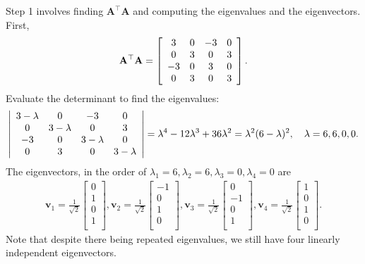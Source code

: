 Step 1 involves finding $\mathbf{A}^\top \mathbf{A}$ and computing the eigenvalues and the eigenvectors. First,
\begin{align}
  \mathbf{A}^\top \mathbf{A} = \left[ \begin{array}{c c c c}
   3 &  0 & -3 &  0 \\
   0 &  3 &  0 &  3 \\
  -3 &  0 &  3 &  0 \\
   0 &  3 &  0 &  3 \\ \end{array}  \right] .
\end{align}
Evaluate the determinant to find the eigenvalues:
\begin{align}
  \left| \begin{array}{c c c c}
   3 - \lambda &  0 & -3 &  0 \\
   0 &  3 - \lambda &  0 &  3 \\
  -3 &  0 &  3 - \lambda &  0 \\
   0 &  3 &  0 &  3 - \lambda \\ \end{array} \right| = \lambda^4 - 12 \lambda^3 + 36 \lambda^2 = \lambda^2 ( 6 - \lambda )^2 , \quad \lambda = 6, 6, 0, 0.
\end{align}
The eigenvectors, in the order of $\lambda_1 = 6, \lambda_2 = 6, \lambda_3 = 0, \lambda_4 = 0$ are
\begin{align}
  \mathbf{v}_1 = \frac{1}{\sqrt{2}} \left[ \begin{array}{c}  0 \\  1 \\  0 \\  1 \\ \end{array} \right] , 
  \mathbf{v}_2 = \frac{1}{\sqrt{2}} \left[ \begin{array}{c} -1 \\  0 \\  1 \\  0 \\ \end{array} \right] , 
  \mathbf{v}_3 = \frac{1}{\sqrt{2}} \left[ \begin{array}{c}  0 \\ -1 \\  0 \\  1 \\ \end{array} \right] , 
  \mathbf{v}_4 = \frac{1}{\sqrt{2}} \left[ \begin{array}{c}  1 \\  0 \\  1 \\  0 \\ \end{array} \right] .
\end{align}
Note that despite there being repeated eigenvalues, we still have four linearly independent eigenvectors.

